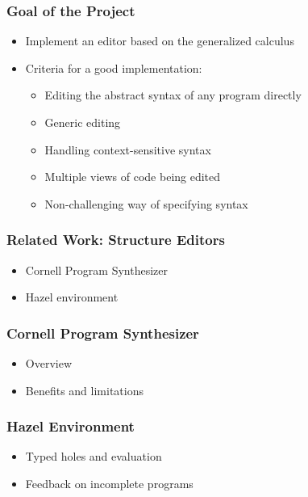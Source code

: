 \documentclass[t,24pt,aspectratio=169]{beamer}
\begin{document}
\begin{frame}[hvid]
    \frametitle{Goal of the Project}
    \begin{itemize}
        \item Implement an editor based on the generalized calculus
        \item Criteria for a good implementation:
              \begin{itemize}
                  \pause
                  \item Editing the abstract syntax of any program directly
                        \pause
                  \item Generic editing
                        \pause
                  \item Handling context-sensitive syntax
                        \pause
                  \item Multiple views of code being edited
                        \pause
                  \item Non-challenging way of specifying syntax
              \end{itemize}
    \end{itemize}
\end{frame}

\begin{frame}[hvid]
    \frametitle{Related Work: Structure Editors}
    \begin{itemize}
        \item Cornell Program Synthesizer
        \item Hazel environment
    \end{itemize}
\end{frame}

\begin{frame}[hvid]
    \frametitle{Cornell Program Synthesizer}
    \begin{itemize}
        \item Overview
        \item Benefits and limitations
    \end{itemize}
\end{frame}

\begin{frame}[hvid]
    \frametitle{Hazel Environment}
    \begin{itemize}
        \item Typed holes and evaluation
        \item Feedback on incomplete programs
    \end{itemize}
\end{frame}
\end{document}
